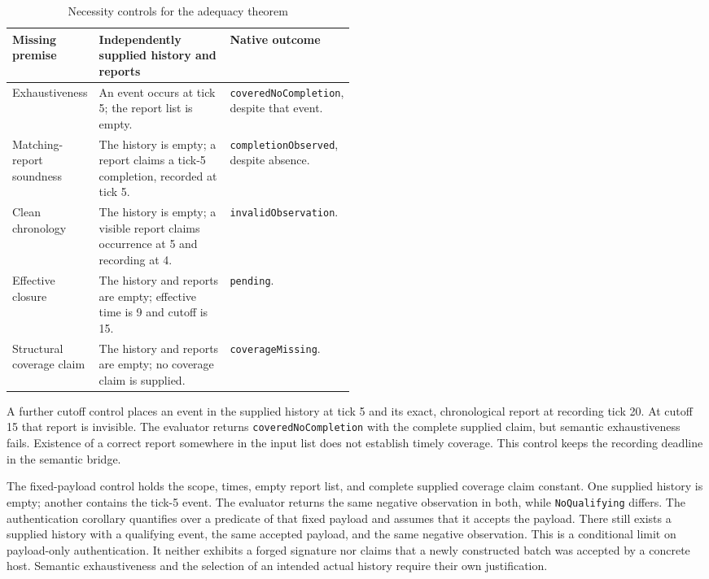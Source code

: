 \documentclass[11pt]{article}
\begin{document}
\begin{table}[htbp]
\centering\small
\caption{Necessity controls for the adequacy theorem}
\begin{tabularx}{\linewidth}{@{}>{\raggedright\arraybackslash}p{0.25\linewidth}Y>{\raggedright\arraybackslash}p{0.24\linewidth}@{}}
\toprule
Missing premise & Independently supplied history and reports & Native outcome \\
\midrule
Exhaustiveness & An event occurs at tick 5; the report list is empty. & \texttt{coveredNoCompletion}, despite that event. \\
Matching-report soundness & The history is empty; a report claims a tick-5 completion, recorded at tick 5. & \texttt{completionObserved}, despite absence. \\
Clean chronology & The history is empty; a visible report claims occurrence at 5 and recording at 4. & \texttt{invalidObservation}. \\
Effective closure & The history and reports are empty; effective time is 9 and cutoff is 15. & \texttt{pending}. \\
Structural coverage claim & The history and reports are empty; no coverage claim is supplied. & \texttt{coverageMissing}. \\
\bottomrule
\end{tabularx}
\end{table}

A further cutoff control places an event in the supplied history at tick 5 and its exact, chronological report at recording tick 20. At cutoff 15 that report is invisible. The evaluator returns \texttt{coveredNoCompletion} with the complete supplied claim, but semantic exhaustiveness fails. Existence of a correct report somewhere in the input list does not establish timely coverage. This control keeps the recording deadline in the semantic bridge.

The fixed-payload control holds the scope, times, empty report list, and complete supplied coverage claim constant. One supplied history is empty; another contains the tick-5 event. The evaluator returns the same negative observation in both, while \texttt{NoQualifying} differs. The authentication corollary quantifies over a predicate of that fixed payload and assumes that it accepts the payload. There still exists a supplied history with a qualifying event, the same accepted payload, and the same negative observation. This is a conditional limit on payload-only authentication. It neither exhibits a forged signature nor claims that a newly constructed batch was accepted by a concrete host. Semantic exhaustiveness and the selection of an intended actual history require their own justification.
\end{document}
